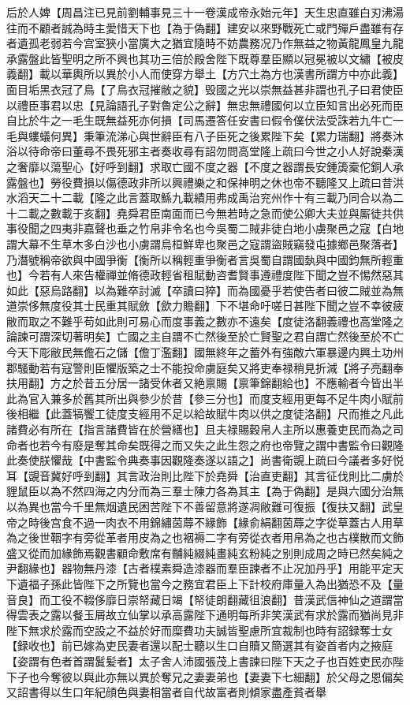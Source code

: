后於人婢【周昌注已見前劉輔事見三十一卷漢成帝永始元年】天生忠直雖白刃沸湯往而不顧者誠為時主愛惜天下也【為于偽翻】建安以來野戰死亡或門殫戶盡雖有存者遺孤老弱若今宫室狹小當廣大之猶宜隨時不妨農務况乃作無益之物黃龍鳳皇九龍承露盤此皆聖明之所不興也其功三倍於殿舍陛下既尊羣臣顯以冠冕被以文繡【被皮義翻】載以華輿所以異於小人而使穿方舉土【方穴土為方也漢書所謂方中亦此義】面目垢黑衣冠了鳥【了鳥衣冠摧敝之貌】毁國之光以崇無益甚非謂也孔子曰君使臣以禮臣事君以忠【見論語孔子對魯定公之辭】無忠無禮國何以立臣知言出必死而臣自比於牛之一毛生既無益死亦何損【司馬遷答任安書曰假令僕伏法受誅若九牛亡一毛與螻蟻何異】秉筆流涕心與世辭臣有八子臣死之後累陛下矣【累力瑞翻】將奏沐浴以待命帝曰董尋不畏死邪主者奏收尋有詔勿問高堂隆上疏曰今世之小人好說秦漢之奢靡以蕩聖心【好呼到翻】求取亡國不度之器【不度之器謂長安鍾簴槖佗銅人承露盤也】勞役費損以傷德政非所以興禮樂之和保神明之休也帝不聽隆又上疏曰昔洪水滔天二十二載【隆之此言蓋取鯀九載績用弗成禹治兖州作十有三載乃同合以為二十二載之數載于亥翻】堯舜君臣南面而已今無若時之急而使公卿大夫並與厮徒共供事役聞之四夷非嘉聲也垂之竹帛非令名也今吳蜀二賊非徒白地小虜聚邑之寇【白地謂大幕不生草木多白沙也小虜謂烏桓鮮卑也聚邑之寇謂盜賊竊發屯據鄉邑聚落者】乃潛號稱帝欲與中國爭衡【衡所以稱輕重爭衡者言吳蜀自謂國埶與中國鈞無所輕重也】今若有人來告權禪並脩德政輕省租賦動咨耆賢事遵禮度陛下聞之豈不惕然惡其如此【惡烏路翻】以為難卒討滅【卒讀曰猝】而為國憂乎若使告者曰彼二賊並為無道崇侈無度役其士民重其賦斂【歛力贍翻】下不堪命吁嗟日甚陛下聞之豈不幸彼疲敝而取之不難乎苟如此則可易心而度事義之數亦不遠矣【度徒洛翻義禮也高堂隆之論諫可謂深切著明矣】亡國之主自謂不亡然後至於亡賢聖之君自謂亡然後至於不亡今天下彫敝民無儋石之儲【儋丁濫翻】國無終年之蓄外有強敵六軍暴邊内興土功州郡騷動若有寇警則臣懼版築之士不能投命虜庭矣又將吏奉禄稍見折減【將子亮翻奉扶用翻】方之於昔五分居一諸受休者又絶禀賜【禀筆錦翻給也】不應輸者今皆出半此為官入兼多於舊其所出與參少於昔【參三分也】而度支經用更每不足牛肉小賦前後相繼【此蓋犒饗工徒度支經用不足以給故賦牛肉以供之度徒洛翻】尺而推之凡此諸費必有所在【指言諸費皆在於營繕也】且夫禄賜穀帛人主所以惠養吏民而為之司命者也若今有廢是奪其命矣既得之而又失之此生怨之府也帝覽之謂中書監令曰觀隆此奏使朕懼哉【中書監令典奏事因觀隆奏遂以語之】尚書衛覬上疏曰今議者多好悦耳【覬音冀好呼到翻】其言政治則比陛下於堯舜【治直吏翻】其言征伐則比二虜於貍鼠臣以為不然四海之内分而為三羣士陳力各為其主【為于偽翻】是與六國分治無以為異也當今千里無烟遺民困苦陛下不善留意將遂凋敝難可復振【復扶又翻】武皇帝之時後宫食不過一肉衣不用錦繡茵蓐不緣飾【緣俞絹翻茵蓐之字從草蓋古人用草為之後世鞇字有旁從革者用皮為之也裀褥二字有旁從衣者用帛為之也古樸散而文飾盛又從而加緣飾焉觀書顧命敷席有黼純綴純畫純玄粉純之别則成周之時已然矣純之尹翻緣也】器物無丹漆【古者樸素舜造漆器而羣臣諫者不止况加丹乎】用能平定天下遺福子孫此皆陛下之所覽也當今之務宜君臣上下計校府庫量入為出猶恐不及【量音良】而工役不輟侈靡日崇帑藏日竭【帑徒朗翻藏徂浪翻】昔漢武信神仙之道謂當得雲表之露以餐玉屑故立仙掌以承高露陛下通明每所非笑漢武有求於露而猶尚見非陛下無求於露而空設之不益於好而糜費功夫誠皆聖慮所宜裁制也時有詔録奪士女【録收也】前已嫁為吏民妻者還以配士聽以生口自贖又簡選其有姿首者内之掖庭【姿謂有色者首謂鬒髪者】太子舍人沛國張茂上書諫曰陛下天之子也百姓吏民亦陛下子也今奪彼以與此亦無以異於奪兄之妻妻弟也【妻妻下七細翻】於父母之恩偏矣又詔書得以生口年紀顔色與妻相當者自代故富者則傾家盡產貧者舉